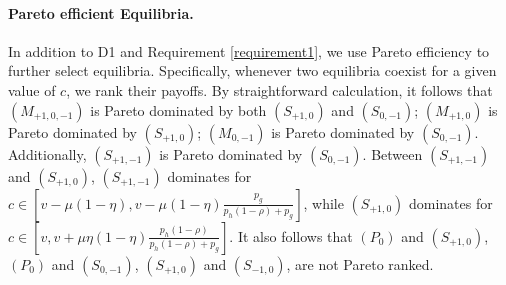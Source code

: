 \documentclass[english,12pt]{article}
\theoremstyle{plain}
\theoremstyle{plain}
\theoremstyle{definition}
\theoremstyle{definition}
\theoremstyle{assumption}
\theoremstyle{plain}
\theoremstyle{plain}
\theoremstyle{plain}
\theoremstyle{plain}
\theoremstyle{definition}%
\theoremstyle{plain}
\theoremstyle{plain}
\theoremstyle{plain}
\theoremstyle{plain}
\theoremstyle{plain}
\theoremstyle{plain}
\begin{document}
\paragraph{Pareto efficient Equilibria.} In addition to D1 and Requirement \ref{requirement1}, we use Pareto efficiency to further select equilibria. Specifically, whenever two equilibria coexist for a given value of $c$, we rank their payoffs. By straightforward calculation, it follows that $(M_{+1,0,-1})$ is Pareto dominated by both $(S_{+1,0})$ and $(S_{0,-1})$; $(M_{+1,0})$ is Pareto dominated by $(S_{+1,0})$; $(M_{0,-1})$ is Pareto dominated by $(S_{0,-1})$. Additionally, $(S_{+1,-1})$ is Pareto dominated by $(S_{0,-1})$. Between $(S_{+1,-1})$ and $(S_{+1,0})$, $(S_{+1,-1})$ dominates for $c\in [v-\mu(1-\eta),v-\mu(1-\eta)\frac{p_g}{p_h(1-\rho)+p_g}]$, while $(S_{+1,0})$ dominates for $c\in [v,v+\mu\eta(1-\eta)\frac{p_h(1-\rho)}{p_h(1-\rho)+p_g}]$. It also follows that $(P_0)$ and $(S_{+1,0})$, $(P_0)$ and $(S_{0,-1})$, $(S_{+1,0})$ and $(S_{-1,0})$, are not Pareto ranked.

\newpage

 
\end{document}
